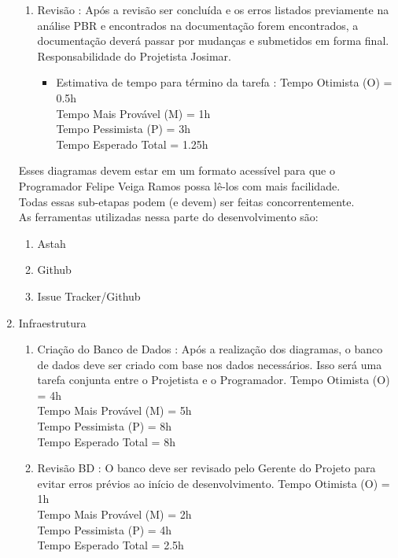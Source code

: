 \documentclass[12pt,a4paper,final]{report}
\begin{document}
\begin{enumerate}
\begin{enumerate}
\item Revisão : Após a revisão ser concluída e os erros listados previamente na análise PBR e encontrados na documentação forem encontrados, a documentação deverá passar por mudanças e submetidos em forma final. Responsabilidade do Projetista Josimar.
\begin{itemize}
\item Estimativa de tempo para término da tarefa :
Tempo Otimista (O) = 0.5h\\
Tempo Mais Provável (M) = 1h\\
Tempo Pessimista (P) = 3h\\
Tempo Esperado Total = 1.25h
\end{itemize} 
\end{enumerate}

Esses diagramas devem estar em um formato acessível para que o Programador Felipe Veiga Ramos possa lê-los com mais facilidade.\\
Todas essas sub-etapas podem (e devem) ser feitas concorrentemente.\\
As ferramentas utilizadas nessa parte do desenvolvimento são:
\begin{enumerate}
\item Astah
\item Github
\item Issue Tracker/Github
\end{enumerate}

\item Infraestrutura
\begin{enumerate}
\item Criação do Banco de Dados : Após a realização dos diagramas, o banco de dados deve ser criado com base nos dados necessários. Isso será uma tarefa conjunta entre o Projetista e o Programador.
Tempo Otimista (O) = 4h\\
Tempo Mais Provável (M) = 5h\\
Tempo Pessimista (P) = 8h\\
Tempo Esperado Total = 8h

\item Revisão BD : O banco deve ser revisado pelo Gerente do Projeto para evitar erros prévios ao início de desenvolvimento.
Tempo Otimista (O) = 1h\\
Tempo Mais Provável (M) = 2h\\
Tempo Pessimista (P) = 4h\\
Tempo Esperado Total = 2.5h
\end{enumerate}


\end{enumerate}
\end{document}
